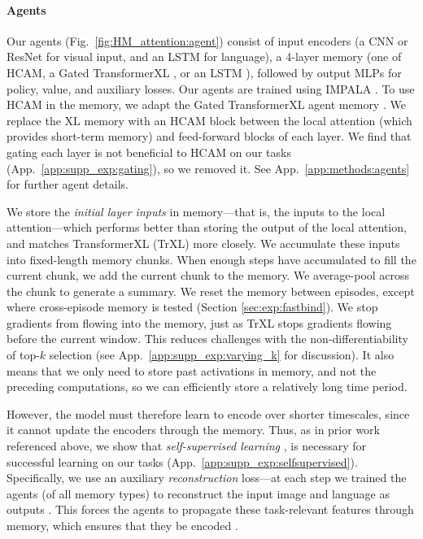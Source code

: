 \documentclass{article}
\begin{document}
\paragraph{Agents}
 Our agents (Fig.\ \ref{fig:HM_attention:agent}) consist of input encoders (a CNN or ResNet for visual input, and an LSTM for language), a 4-layer memory (one of HCAM, a Gated TransformerXL \citep{parisotto2020stabilizing}, or an LSTM \citep{hochreiter1997long}), followed by output MLPs for policy, value, and auxiliary losses. Our agents are trained using IMPALA \citep{espeholt2018impala}. To use HCAM in the memory, we adapt the Gated TransformerXL agent memory \citep{parisotto2020stabilizing}. We replace the XL memory with an HCAM block between the local attention (which provides short-term memory) and feed-forward blocks of each layer. We find that gating each layer \citep{parisotto2020stabilizing} is not beneficial to HCAM on our tasks (App.\ \ref{app:supp_exp:gating}), so we removed it. See App.\ \ref{app:methods:agents} for further agent details. 
 
 We store the \emph{initial layer inputs} in memory---that is, the inputs to the local attention---which performs better than storing the output of the local attention, and matches TransformerXL (TrXL) more closely. We accumulate these inputs into fixed-length memory chunks. When enough steps have accumulated to fill the current chunk, we add the current chunk to the memory. We average-pool across the chunk to generate a summary. We reset the memory between episodes, except where cross-episode memory is tested (Section \ref{sec:exp:fastbind}). We stop gradients from flowing into the memory, just as TrXL \citep{dai2019transformer} stops gradients flowing before the current window. This reduces challenges with the non-differentiability of top-\(k\) selection (see App.\ \ref{app:supp_exp:varying_k} for discussion). It also means that we only need to store past activations in memory, and not the preceding computations, so we can efficiently store a relatively long time period.
 
 However, the model must therefore learn to encode over shorter timescales, since it cannot update the encoders through the memory. Thus, as in prior work referenced above, we show that \emph{self-supervised learning} \citep{liu2020self}, is necessary for successful learning on our tasks (App.\ \ref{app:supp_exp:selfsupervised}). Specifically, we use an auxiliary \emph{reconstruction} loss---at each step we trained the agents (of all memory types) to reconstruct the input image and language as outputs \citep{hill2020grounded}. This forces the agents to propagate these task-relevant features through memory, which ensures that they  be encoded \citep[cf.][]{hung2019optimizing,fortunato2019generalization}.
\end{document}
